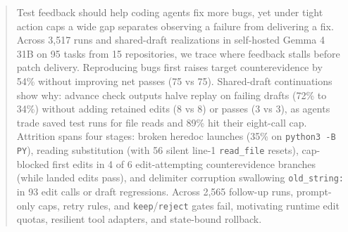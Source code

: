 \begin{abstract}
Test feedback should help coding agents fix more bugs, yet under tight action caps a wide gap separates observing a failure from delivering a fix. Across 3,517 runs and shared-draft realizations in self-hosted Gemma 4 31B on 95 tasks from 15 repositories, we trace where feedback stalls before patch delivery. Reproducing bugs first raises target counterevidence by 54\% without improving net passes (75 vs 75). Shared-draft continuations show why: advance check outputs halve replay on failing drafts (72\% to 34\%) without adding retained edits (8 vs 8) or passes (3 vs 3), as agents trade saved test runs for file reads and 89\% hit their eight-call cap. Attrition spans four stages: broken heredoc launches (35\% on \texttt{python3 -B PY}), reading substitution (with 56 silent line-1 \texttt{read\_file} resets), cap-blocked first edits in 4 of 6 edit-attempting counterevidence branches (while landed edits pass), and delimiter corruption swallowing \texttt{old\_string:} in 93 edit calls or draft regressions. Across 2,565 follow-up runs, prompt-only caps, retry rules, and \texttt{keep}/\texttt{reject} gates fail, motivating runtime edit quotas, resilient tool adapters, and state-bound rollback.
\end{abstract}
